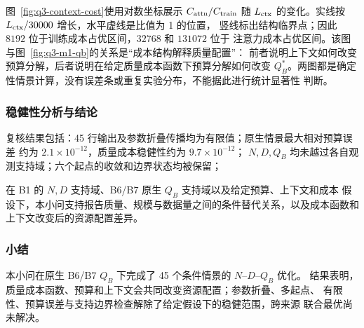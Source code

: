 图~\ref{fig:q3-context-cost}使用对数坐标展示 $C_{\rm attn}/C_{\rm train}$ 随
$L_{\rm ctx}$ 的变化。实线按 $L_{\rm ctx}/30000$ 增长，水平虚线是比值为 1 的位置，
竖线标出结构临界点；因此 $8192$ 位于训练成本占优区间，$32768$ 和 $131072$ 位于
注意力成本占优区间。该图与图~\ref{fig:q3-m1-qb}的关系是“成本结构解释质量配置”：
前者说明上下文如何改变预算分解，后者说明在给定质量成本函数下预算分解如何改变
$Q_B^*$。两图都是确定性情景计算，没有误差条或重复实验分布，不能据此进行统计显著性
判断。

\subsubsection{稳健性分析与结论}

复核结果包括：45 行输出及参数折叠传播均为有限值；原生情景最大相对预算误差
约为 $2.1\times10^{-12}$，质量成本稳健性约为 $9.7\times10^{-12}$；
$N,D,Q_B$ 均未越过各自观测支持域；六个起点的收敛和边界状态均被保留；

在 B1 的 $N,D$ 支持域、B6/B7 原生 $Q_B$ 支持域以及给定预算、上下文和成本
假设下，本小问支持报告质量、规模与数据量之间的条件替代关系，以及成本函数和
上下文改变后的资源配置差异。

\subsubsection{小结}

本小问在原生 B6/B7 $Q_B$ 下完成了 45 个条件情景的 $N$--$D$--$Q_B$ 优化。
结果表明，质量成本函数、预算和上下文会共同改变资源配置；参数折叠、多起点、
有限性、预算误差与支持边界检查解除了给定假设下的稳健范围，跨来源
联合最优尚未解决。
